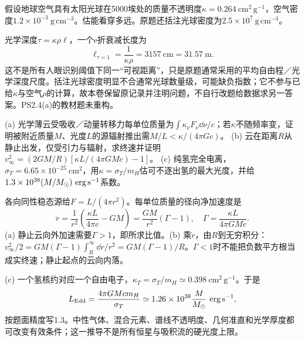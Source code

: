 \begin{exercise}
假设地球空气具有太阳光球在5000埃处的质量不透明度$\kappa=0.264\ \mathrm{cm^2\,g^{-1}}$，空气密度$1.2\times10^{-3}\ \mathrm{g\,cm^{-3}}$。估能看穿多远。原题还括注光球密度为$2.5\times10^7\ \mathrm{g\,cm^{-3}}$。
\end{exercise}
\begin{solution}
光学深度$\tau=\kappa\rho\ell$，一个e折衰减长度为
\[
 \ell_{\tau=1}=\frac1{\kappa\rho}
 =3157\ \mathrm{cm}=31.57\ \mathrm m.
\]
这不是所有人眼识别阈值下同一“可视距离”，只是原题通常采用的平均自由程／光学深度尺度。括注光球密度明显不合通常光球数量级，可能缺负指数；它不参与已给$\kappa$与空气$\rho$的计算，故本卷保留原记录并注明问题，不自行改题给数据求另一答案。PS2.4(a)的教材题未重构。
\end{solution}

\begin{exercise}
(a) 光学薄云受吸收／动量转移力每单位质量为$\int\kappa_\nu F_\nu\dd\nu/c$；若$\kappa$不随频率变，证明被附近质量$M$、光度$L$的源辐射推出需$M/L<\kappa/(4\pi Gc)$。
(b) 云在距离$R$从静止出发，仅受引力与辐射，求终速并证明$v_\infty^2=(2GM/R)[\kappa L/(4\pi GMc)-1]$。
(c) 纯氢完全电离，$\sigma_T=6.65\times10^{-25}\ \mathrm{cm^2}$，用$\kappa=\sigma_T/m_H$估可不逐出氢的最大光度，并给$1.3\times10^{38}(M/\Ms)\ \mathrm{erg\,s^{-1}}$系数。
\end{exercise}
\begin{solution}
各向同性稳态源给$F=L/(4\pi r^2)$。每单位质量的径向净加速度是
\[
 \ddot r=\frac1{r^2}\left(\frac{\kappa L}{4\pi c}-GM\right)
 =\frac{GM}{r^2}(\Gamma-1),\quad
 \Gamma=\frac{\kappa L}{4\pi GMc}.
\]
(a) 静止云向外加速需要$\Gamma>1$，即所求比值。(b) 乘$\dot r$，由$R$到无穷积分：
$v_\infty^2/2=GM(\Gamma-1)\int_R^\infty\dd r/r^2=GM(\Gamma-1)/R$。$\Gamma<1$时不能把负数平方根当成实终速；静止起点的云向内落。

(c) 一个氢核约对应一个自由电子，$\kappa_T=\sigma_T/m_H\simeq0.398\ \mathrm{cm^2\,g^{-1}}$。于是
\[
 L_{\rm Edd}=\frac{4\pi GMcm_H}{\sigma_T}
 \simeq1.26\times10^{38}\frac M{M_{\odot}}\ \mathrm{erg\,s^{-1}},
\]
按题面精度写1.3。中性气体、混合元素、谱线不透明度、几何准直和光学厚度都可改变有效条件；这一推导不是所有恒星与吸积流的硬光度上限。
\end{solution}

